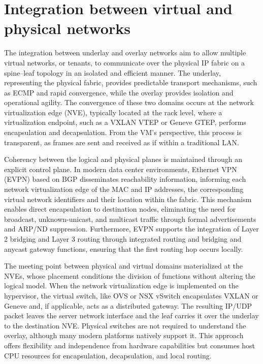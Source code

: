 \section{Integration between virtual and physical networks}

The integration between underlay and overlay networks aim to allow multiple virtual networks, or tenants, to communicate over the physical IP fabric on a spine–leaf topology in an isolated and efficient manner. The underlay, representing the physical fabric, provides predictable transport mechanisms, such as ECMP and rapid convergence, while the overlay provides isolation and operational agility. The convergence of these two domains occurs at the network virtualization edge (NVE), typically located at the rack level, where a virtualization endpoint, such as a VXLAN VTEP or Geneve GTEP, performs encapsulation and decapsulation. From the VM's perspective, this process is transparent, as frames are sent and received as if within a traditional LAN.

Coherency between the logical and physical planes is maintained through an explicit control plane. In modern data center environments, Ethernet VPN (EVPN) based on BGP disseminates reachability information, informing each network virtualization edge of the MAC and IP addresses, the corresponding virtual network identifiers and their location within the fabric. This mechanism enables direct encapsulation to destination nodes, eliminating the need for broadcast, unknown-unicast, and multicast traffic through formal advertisements and ARP/ND suppression. Furthermore, EVPN supports the integration of Layer 2 bridging and Layer 3 routing through integrated routing and bridging and anycast gateway functions, ensuring that the first routing hop occurs locally.

The meeting point between physical and virtual domains materialized at the NVEs, whose placement conditions the division of functions without altering the logical model. When the network virtualization edge is implemented on the hypervisor, the virtual switch, like OVS or NSX vSwitch encapsulates VXLAN or Geneve and, if applicable, acts as a distributed gateway. The resulting IP/UDP packet leaves the server network interface and the leaf carries it over the underlay to the destination NVE. Physical switches are not required to understand the overlay, although many modern platforms natively support it. This approach offers flexibility and independence from hardware capabilities but consumes host CPU resources for encapsulation, decapsulation, and local routing.

